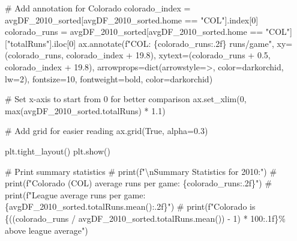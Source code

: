 \documentclass[
  letterpaper,
  DIV=11,
  numbers=noendperiod]{scrartcl}
\newenvironment{Shaded}{\begin{snugshade}}{\end{snugshade}}
\newcommand{\BuiltInTok}[1]{\textcolor[rgb]{0.00,0.23,0.31}{#1}}
\newcommand{\CommentTok}[1]{\textcolor[rgb]{0.37,0.37,0.37}{#1}}
\newcommand{\DecValTok}[1]{\textcolor[rgb]{0.68,0.00,0.00}{#1}}
\newcommand{\FloatTok}[1]{\textcolor[rgb]{0.68,0.00,0.00}{#1}}
\newcommand{\NormalTok}[1]{\textcolor[rgb]{0.00,0.23,0.31}{#1}}
\newcommand{\OperatorTok}[1]{\textcolor[rgb]{0.37,0.37,0.37}{#1}}
\newcommand{\SpecialCharTok}[1]{\textcolor[rgb]{0.37,0.37,0.37}{#1}}
\newcommand{\SpecialStringTok}[1]{\textcolor[rgb]{0.13,0.47,0.30}{#1}}
\newcommand{\StringTok}[1]{\textcolor[rgb]{0.13,0.47,0.30}{#1}}
\newcommand{\VariableTok}[1]{\textcolor[rgb]{0.07,0.07,0.07}{#1}}
\begin{document}
\begin{Shaded}
\begin{Highlighting}[]
\CommentTok{\# Add annotation for Colorado}
\NormalTok{colorado\_index }\OperatorTok{=}\NormalTok{ avgDF\_2010\_sorted[avgDF\_2010\_sorted.home }\OperatorTok{==} \StringTok{"COL"}\NormalTok{].index[}\DecValTok{0}\NormalTok{]}
\NormalTok{colorado\_runs }\OperatorTok{=}\NormalTok{ avgDF\_2010\_sorted[avgDF\_2010\_sorted.home }\OperatorTok{==} \StringTok{"COL"}\NormalTok{][}\StringTok{"totalRuns"}\NormalTok{].iloc[}\DecValTok{0}\NormalTok{]}
\NormalTok{ax.annotate(}\SpecialStringTok{f"COL: }\SpecialCharTok{\{}\NormalTok{colorado\_runs}\SpecialCharTok{:.2f\}}\SpecialStringTok{ runs/game"}\NormalTok{, }
\NormalTok{            xy}\OperatorTok{=}\NormalTok{(colorado\_runs, colorado\_index }\OperatorTok{+} \FloatTok{19.8}\NormalTok{), }
\NormalTok{            xytext}\OperatorTok{=}\NormalTok{(colorado\_runs }\OperatorTok{+} \FloatTok{0.5}\NormalTok{, colorado\_index }\OperatorTok{+} \FloatTok{19.8}\NormalTok{),}
\NormalTok{            arrowprops}\OperatorTok{=}\BuiltInTok{dict}\NormalTok{(arrowstyle}\OperatorTok{=}\StringTok{\textquotesingle{}{-}\textgreater{}\textquotesingle{}}\NormalTok{, color}\OperatorTok{=}\StringTok{\textquotesingle{}darkorchid\textquotesingle{}}\NormalTok{, lw}\OperatorTok{=}\DecValTok{2}\NormalTok{),}
\NormalTok{            fontsize}\OperatorTok{=}\DecValTok{10}\NormalTok{, fontweight}\OperatorTok{=}\StringTok{\textquotesingle{}bold\textquotesingle{}}\NormalTok{, color}\OperatorTok{=}\StringTok{\textquotesingle{}darkorchid\textquotesingle{}}\NormalTok{)}

\CommentTok{\# Set x{-}axis to start from 0 for better comparison}
\NormalTok{ax.set\_xlim(}\DecValTok{0}\NormalTok{, }\BuiltInTok{max}\NormalTok{(avgDF\_2010\_sorted.totalRuns) }\OperatorTok{*} \FloatTok{1.1}\NormalTok{)}

\CommentTok{\# Add grid for easier reading}
\NormalTok{ax.grid(}\VariableTok{True}\NormalTok{, alpha}\OperatorTok{=}\FloatTok{0.3}\NormalTok{)}

\NormalTok{plt.tight\_layout()}
\NormalTok{plt.show()}


\CommentTok{\# Print summary statistics}
\CommentTok{\# print(f"\textbackslash{}nSummary Statistics for 2010:")}
\CommentTok{\# print(f"Colorado (COL) average runs per game: \{colorado\_runs:.2f\}")}
\CommentTok{\# print(f"League average runs per game: \{avgDF\_2010\_sorted.totalRuns.mean():.2f\}")}
\CommentTok{\# print(f"Colorado is \{((colorado\_runs / avgDF\_2010\_sorted.totalRuns.mean()) {-} 1) * 100:.1f\}\% above league average")}
\end{Highlighting}
\end{Shaded}
\end{document}
